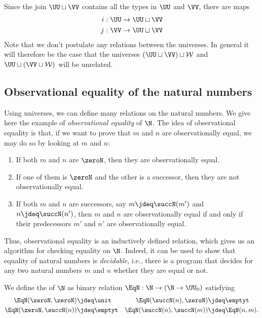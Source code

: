 \begin{rmk}\label{rmk:join-universe}
  Since the join $\UU\sqcup\VV$ contains all the types in $\UU$ and $\VV$, there are maps
  \begin{align*}
    i : \UU\to\UU\sqcup\VV \\
    j : \VV\to\UU\sqcup\VV
  \end{align*}
  Note that we don't postulate any relations between the universes. In general it will therefore be the case that the universes $(\UU\sqcup\VV)\sqcup\mathcal{W}$ and $\UU\sqcup(\VV\sqcup\mathcal{W})$ will be unrelated.
\end{rmk}

\subsection{Observational equality of the natural numbers}

Using universes, we can define many relations on the natural numbers. We give here the example of \emph{observational equality} of $\N$. The idea of observational equality is that, if we want to prove that $m$ and $n$ are observationally equal, we may do so by looking at $m$ and $n$:
\begin{enumerate}
\item If both $m$ and $n$ are $\zeroN$, then they are observationally equal.
\item If one of them is $\zeroN$ and the other is a successor, then they are not observationally equal.
\item If both $m$ and $n$ are successors, say $m\jdeq\succN(m')$ and $n\jdeq \succN(n')$, then $m$ and $n$ are observationally equal if and only if their predecessors $m'$ and $n'$ are observationally equal.
\end{enumerate}
Thus, observational equality is an inductively defined relation, which gives us an algorithm for checking equality on $\N$. Indeed, it can be used to show that equality of natural numbers is \emph{decidable}, i.e., there is a program that decides for any two natural numbers $m$ and $n$ whether they are equal or not.

\begin{defn}\label{defn:obs_nat}
We define the  of $\N$ as binary relation $\EqN:\N\to(\N\to\UU_0)$ satisfying
\begin{align*}
\EqN(\zeroN,\zeroN) & \jdeq \unit & \EqN(\succN(n),\zeroN) & \jdeq \emptyt \\
\EqN(\zeroN,\succN(n)) & \jdeq \emptyt & \EqN(\succN(n),\succN(m)) & \jdeq \EqN(n,m).
\end{align*}
\end{defn}

